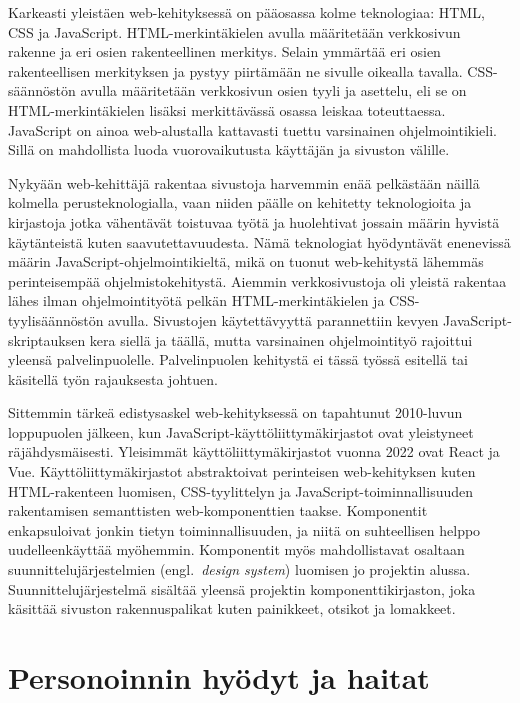 \documentclass[finnish, 12pt, a4paper, elec, utf8, a-1b, online]{aaltothesis}
\begin{document}
Karkeasti yleistäen web-kehityksessä on pääosassa kolme teknologiaa: HTML, CSS
ja JavaScript. HTML-merkintäkielen avulla määritetään verkkosivun rakenne ja eri
osien rakenteellinen merkitys. Selain ymmärtää eri osien rakenteellisen
merkityksen ja pystyy piirtämään ne sivulle oikealla tavalla. CSS-säännöstön
avulla määritetään verkkosivun osien tyyli ja asettelu, eli se on
HTML-merkintäkielen lisäksi merkittävässä osassa leiskaa toteuttaessa.
JavaScript on ainoa web-alustalla kattavasti tuettu varsinainen
ohjelmointikieli. Sillä on mahdollista luoda vuorovaikutusta käyttäjän ja
sivuston välille.

Nykyään web-kehittäjä rakentaa sivustoja harvemmin enää pelkästään näillä
kolmella perusteknologialla, vaan niiden päälle on kehitetty teknologioita ja
kirjastoja jotka vähentävät toistuvaa työtä ja huolehtivat jossain määrin
hyvistä käytänteistä kuten saavutettavuudesta. Nämä teknologiat hyödyntävät
enenevissä määrin JavaScript-ohjelmointikieltä, mikä on tuonut web-kehitystä
lähemmäs perinteisempää ohjelmistokehitystä. Aiemmin verkkosivustoja oli yleistä
rakentaa lähes ilman ohjelmointityötä pelkän HTML-merkintäkielen ja
CSS-tyylisäännöstön avulla. Sivustojen käytettävyyttä parannettiin kevyen
JavaScript-skriptauksen kera siellä ja täällä, mutta varsinainen ohjelmointityö
rajoittui yleensä palvelinpuolelle. Palvelinpuolen kehitystä ei tässä työssä
esitellä tai käsitellä työn rajauksesta johtuen.

Sittemmin tärkeä edistysaskel web-kehityksessä on tapahtunut 2010-luvun
loppupuolen jälkeen, kun JavaScript-käyttöliittymäkirjastot ovat yleistyneet
räjähdysmäisesti. Yleisimmät käyttöliittymäkirjastot vuonna 2022 ovat React ja
Vue. Käyttöliittymäkirjastot abstraktoivat perinteisen web-kehityksen kuten
HTML-rakenteen luomisen, CSS-tyylittelyn ja JavaScript-toiminnallisuuden
rakentamisen semanttisten web-komponenttien taakse. Komponentit enkapsuloivat
jonkin tietyn toiminnallisuuden, ja niitä on suhteellisen helppo
uudelleenkäyttää myöhemmin. Komponentit myös mahdollistavat osaltaan
suunnittelujärjestelmien (engl.\ \textit{design system}) luomisen jo projektin
alussa. Suunnittelujärjestelmä sisältää yleensä projektin komponenttikirjaston,
joka käsittää sivuston rakennuspalikat kuten painikkeet, otsikot ja lomakkeet.

\clearpage

\section{Personoinnin hyödyt ja haitat}
\end{document}

